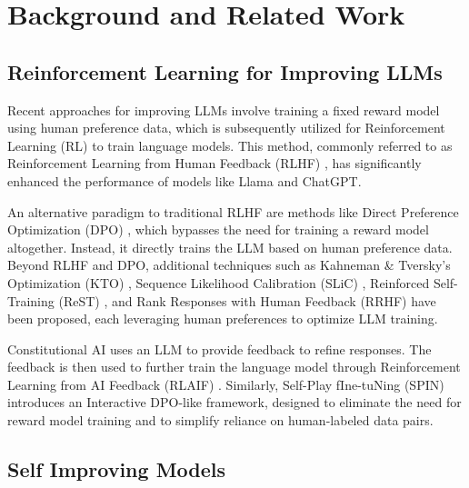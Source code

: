 \section{Background and Related Work}

\subsection{Reinforcement Learning for Improving LLMs}

Recent approaches for improving LLMs involve training a fixed reward model using human preference data, which is subsequently utilized for Reinforcement Learning (RL) to train language models. This method, commonly referred to as Reinforcement Learning from Human Feedback (RLHF) \citep{liu2020learning,ouyang2022training}, has significantly enhanced the performance of models like Llama\citep{touvron2023llama2openfoundation,dubey2024llama} and ChatGPT\citep{openai2024gpt4technicalreport}.

An alternative paradigm to traditional RLHF are methods like Direct Preference Optimization (DPO) \cite{rafailov2024directpreferenceoptimizationlanguage}, which bypasses the need for training a reward model altogether. Instead, it directly trains the LLM based on human preference data. Beyond RLHF and DPO, additional techniques such as Kahneman \& Tversky’s Optimization (KTO) \citep{ethayarajh2024ktomodelalignmentprospect}, Sequence Likelihood Calibration (SLiC) \citep{zhao2023slichfsequencelikelihoodcalibration}, Reinforced Self-Training (ReST) \citep{gulcehre2023reinforcedselftrainingrestlanguage}, and Rank Responses with Human Feedback (RRHF) \citep{yuan2023rrhfrankresponsesalign} have been proposed, each leveraging human preferences to optimize LLM training.

Constitutional AI \citep{bai2022constitutional} uses an LLM to provide feedback to refine responses. The feedback is then used to further train the language model through Reinforcement Learning from AI Feedback (RLAIF) \citep{lee2023rlaif}. Similarly, Self-Play fIne-tuNing (SPIN) \citep{chen2024selfplayfinetuningconvertsweak} introduces an Interactive DPO-like framework, designed to eliminate the need for reward model training and to simplify reliance on human-labeled data pairs.

\subsection{Self Improving Models}

